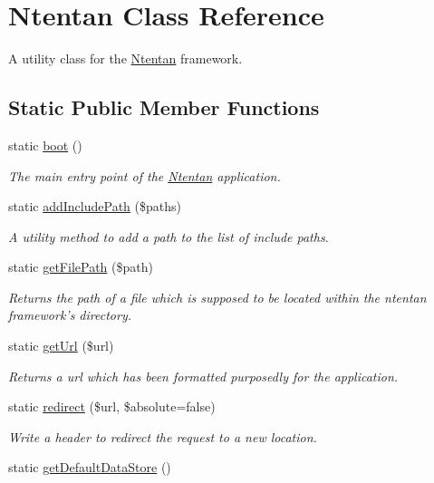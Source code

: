 \hypertarget{class_ntentan}{
\section{Ntentan Class Reference}
\label{class_ntentan}
}


A utility class for the \hyperlink{class_ntentan}{Ntentan} framework.  


\subsection*{Static Public Member Functions}
\begin{DoxyCompactItemize}
\item 
static \hyperlink{class_ntentan_aae9d932cd2d0b993687cbd8a0f6bc017}{boot} ()
\begin{DoxyCompactList}\small\item\em The main entry point of the \hyperlink{class_ntentan}{Ntentan} application. \item\end{DoxyCompactList}\item 
static \hyperlink{class_ntentan_a7e7c64fcc8df8b9a28edd35938c67519}{addIncludePath} (\$paths)
\begin{DoxyCompactList}\small\item\em A utility method to add a path to the list of include paths. \item\end{DoxyCompactList}\item 
static \hyperlink{class_ntentan_ac510c981e4113eaeea9b78e354bbe011}{getFilePath} (\$path)
\begin{DoxyCompactList}\small\item\em Returns the path of a file which is supposed to be located within the ntentan framework's directory. \item\end{DoxyCompactList}\item 
static \hyperlink{class_ntentan_a5a4071aa07e974112467bd283f046928}{getUrl} (\$url)
\begin{DoxyCompactList}\small\item\em Returns a url which has been formatted purposedly for the application. \item\end{DoxyCompactList}\item 
static \hyperlink{class_ntentan_a7fb9274efd2e06979c802fad6f4caaf9}{redirect} (\$url, \$absolute=false)
\begin{DoxyCompactList}\small\item\em Write a header to redirect the request to a new location. \item\end{DoxyCompactList}\item 
\hypertarget{class_ntentan_a7dffd6acc10d40aea8de45682f77d584}{
static \hyperlink{class_ntentan_a7dffd6acc10d40aea8de45682f77d584}{getDefaultDataStore} ()}
\label{class_ntentan_a7dffd6acc10d40aea8de45682f77d584}


\end{DoxyCompactItemize}
